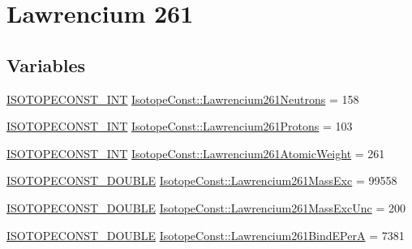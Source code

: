 \hypertarget{group___isotope_const-_lawrencium-_lr261}{}\section{Lawrencium 261}
\label{group___isotope_const-_lawrencium-_lr261}
\subsection*{Variables}
\begin{DoxyCompactItemize}
\item 
\mbox{\hyperlink{group___isotope_const-_macros_ga5f18360b3e99483a35c32d789e62621c}{I\+S\+O\+T\+O\+P\+E\+C\+O\+N\+S\+T\+\_\+\+I\+NT}} \mbox{\hyperlink{group___isotope_const-_lawrencium-_lr261_gac9aa722e3a4a84d1cd0be252c0c594f5}{Isotope\+Const\+::\+Lawrencium261\+Neutrons}} = 158
\item 
\mbox{\hyperlink{group___isotope_const-_macros_ga5f18360b3e99483a35c32d789e62621c}{I\+S\+O\+T\+O\+P\+E\+C\+O\+N\+S\+T\+\_\+\+I\+NT}} \mbox{\hyperlink{group___isotope_const-_lawrencium-_lr261_ga5f0646ddf594db129cbd03e931539ce9}{Isotope\+Const\+::\+Lawrencium261\+Protons}} = 103
\item 
\mbox{\hyperlink{group___isotope_const-_macros_ga5f18360b3e99483a35c32d789e62621c}{I\+S\+O\+T\+O\+P\+E\+C\+O\+N\+S\+T\+\_\+\+I\+NT}} \mbox{\hyperlink{group___isotope_const-_lawrencium-_lr261_ga25dfee4c5312448f29160ed284c2e975}{Isotope\+Const\+::\+Lawrencium261\+Atomic\+Weight}} = 261
\item 
\mbox{\hyperlink{group___isotope_const-_macros_ga8f45a7272ce02c0b4c65c44636ed719a}{I\+S\+O\+T\+O\+P\+E\+C\+O\+N\+S\+T\+\_\+\+D\+O\+U\+B\+LE}} \mbox{\hyperlink{group___isotope_const-_lawrencium-_lr261_gab6c655b855e11f6d30b474fa4fc1f24b}{Isotope\+Const\+::\+Lawrencium261\+Mass\+Exc}} = 99558
\item 
\mbox{\hyperlink{group___isotope_const-_macros_ga8f45a7272ce02c0b4c65c44636ed719a}{I\+S\+O\+T\+O\+P\+E\+C\+O\+N\+S\+T\+\_\+\+D\+O\+U\+B\+LE}} \mbox{\hyperlink{group___isotope_const-_lawrencium-_lr261_gae18f98ceac86794efed6176a5bf87a5f}{Isotope\+Const\+::\+Lawrencium261\+Mass\+Exc\+Unc}} = 200
\item 
\mbox{\hyperlink{group___isotope_const-_macros_ga8f45a7272ce02c0b4c65c44636ed719a}{I\+S\+O\+T\+O\+P\+E\+C\+O\+N\+S\+T\+\_\+\+D\+O\+U\+B\+LE}} \mbox{\hyperlink{group___isotope_const-_lawrencium-_lr261_ga5a7074b045aa5d1c4ba4c15fa7401719}{Isotope\+Const\+::\+Lawrencium261\+Bind\+E\+PerA}} = 7381
\item 

\end{DoxyCompactItemize}

